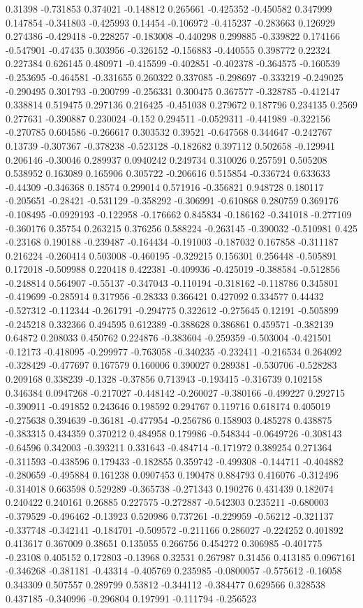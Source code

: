 0.31398 -0.731853 0.374021 -0.148812 0.265661 -0.425352 -0.450582 0.347999 0.147854 -0.341803 -0.425993 0.14454 -0.106972 -0.415237 -0.283663 0.126929 0.274386 -0.429418 -0.228257 -0.183008 -0.440298 0.299885 -0.339822 0.174166 -0.547901 -0.47435 0.303956 -0.326152 -0.156883 -0.440555 0.398772 0.22324 0.227384 0.626145 0.480971 -0.415599 -0.402851 -0.402378 -0.364575 -0.160539 -0.253695 -0.464581 -0.331655 0.260322 0.337085 -0.298697 -0.333219 -0.249025 -0.290495 0.301793 -0.200799 -0.256331 0.300475 0.367577 -0.328785 -0.412147 0.338814 0.519475 0.297136 0.216425 -0.451038 0.279672 0.187796 0.234135 0.2569 0.277631 -0.390887 0.230024 -0.152 0.294511 -0.0529311 -0.441989 -0.322156 -0.270785 0.604586 -0.266617 0.303532 0.39521 -0.647568 0.344647 -0.242767 0.13739 -0.307367 -0.378238 -0.523128 -0.182682 0.397112 0.502658 -0.129941 0.206146 -0.30046 0.289937 0.0940242 0.249734 0.310026 0.257591 0.505208 0.538952 0.163089 0.165906 0.305722 -0.206616 0.515854 -0.336724 0.633633 -0.44309 -0.346368 0.18574 0.299014 0.571916 -0.356821 0.948728 0.180117 -0.205651 -0.28421 -0.531129 -0.358292 -0.306991 -0.610868 0.280759 0.369176 -0.108495 -0.0929193 -0.122958 -0.176662 0.845834 -0.186162 -0.341018 -0.277109 -0.360176 0.35754 0.263215 0.376256 0.588224 -0.263145 -0.390032 -0.510981 0.425 -0.23168 0.190188 -0.239487 -0.164434 -0.191003 -0.187032 0.167858 -0.311187 0.216224 -0.260414 0.503008 -0.460195 -0.329215 0.156301 0.256448 -0.505891 0.172018 -0.509988 0.220418 0.422381 -0.409936 -0.425019 -0.388584 -0.512856 -0.248814 0.564907 -0.55137 -0.347043 -0.110194 -0.318162 -0.118786 0.345801 -0.419699 -0.285914 0.317956 -0.28333 0.366421 0.427092 0.334577 0.44432 -0.527312 -0.112344 -0.261791 -0.294775 0.322612 -0.275645 0.12191 -0.505899 -0.245218 0.332366 0.494595 0.612389 -0.388628 0.386861 0.459571 -0.382139 0.64872 0.208033 0.450762 0.224876 -0.383604 -0.259359 -0.503004 -0.421501 -0.12173 -0.418095 -0.299977 -0.763058 -0.340235 -0.232411 -0.216534 0.264092 -0.328429 -0.477697 0.167579 0.160006 0.390027 0.289381 -0.530706 -0.528283 0.209168 0.338239 -0.1328 -0.37856 0.713943 -0.193415 -0.316739 0.102158 0.346384 0.0947268 -0.217027 -0.448142 -0.260027 -0.380166 -0.499227 0.292715 -0.390911 -0.491852 0.243646 0.198592 0.294767 0.119716 0.618174 0.405019 -0.275638 0.394639 -0.36181 -0.477954 -0.256786 0.158903 0.485278 0.438875 -0.383315 0.434359 0.370212 0.484958 0.179986 -0.548344 -0.0649726 -0.308143 -0.64596 0.342003 -0.393211 0.331643 -0.484714 -0.171972 0.389254 0.271364 -0.311593 -0.438596 0.179433 -0.182855 0.359742 -0.499308 -0.144711 -0.404882 -0.280659 -0.495884 0.161238 0.0907453 0.190478 0.884793 0.416076 -0.312496 -0.314018 0.663598 0.529289 -0.365738 -0.271343 0.190276 0.431439 0.182074 0.240422 0.240161 0.26885 0.227575 -0.272887 -0.542303 0.235211 -0.680003 -0.379529 -0.496462 -0.13923 0.520986 0.737261 -0.229959 -0.56212 -0.321137 -0.337748 -0.342141 -0.184701 -0.509572 -0.211166 0.286027 -0.224252 0.401892 0.413617 0.367009 0.38651 0.135055 0.266756 0.454272 0.306985 -0.401775 -0.23108 0.405152 0.172803 -0.13968 0.32531 0.267987 0.31456 0.413185 0.0967161 -0.346268 -0.381181 -0.43314 -0.405769 0.235985 -0.0800057 -0.575612 -0.16058 0.343309 0.507557 0.289799 0.53812 -0.344112 -0.384477 0.629566 0.328538 0.437185 -0.340996 -0.296804 0.197991 -0.111794 -0.256523 